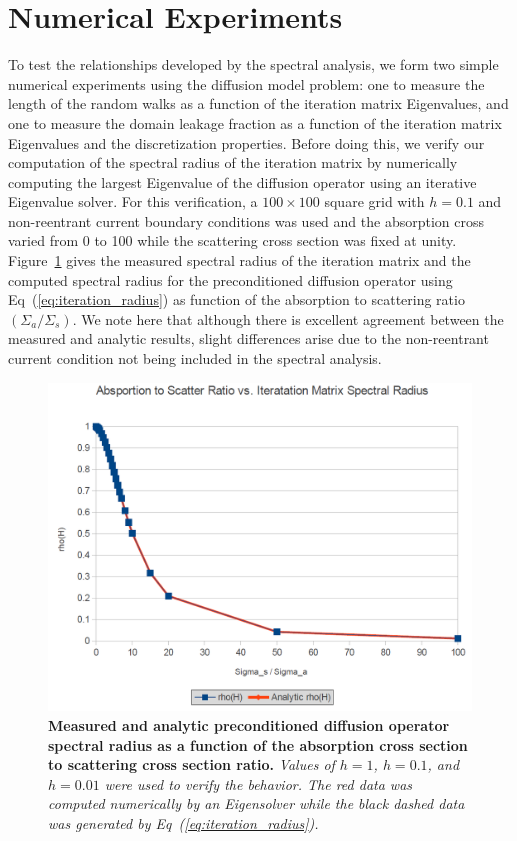 \documentclass[letterpaper,12pt]{article}
\begin{document}
\section{Numerical Experiments}
To test the relationships developed by the spectral analysis, we form
two simple numerical experiments using the diffusion model problem:
one to measure the length of the random walks as a function of the
iteration matrix Eigenvalues, and one to measure the domain leakage
fraction as a function of the iteration matrix Eigenvalues and the
discretization properties. Before doing this, we verify our
computation of the spectral radius of the iteration matrix by
numerically computing the largest Eigenvalue of the diffusion operator
using an iterative Eigenvalue solver. For this verification, a $100
\times 100$ square grid with $h=0.1$ and non-reentrant current
boundary conditions was used and the absorption cross varied from 0 to
100 while the scattering cross section was fixed at
unity. Figure~\ref{fig:measured_spec_rad} gives the measured spectral
radius of the iteration matrix and the computed spectral radius for
the preconditioned diffusion operator using
Eq~(\ref{eq:iteration_radius}) as function of the absorption to
scattering ratio $(\Sigma_a / \Sigma_s)$. We note here that although
there is excellent agreement between the measured and analytic
results, slight differences arise due to the non-reentrant
current condition not being included in the spectral analysis.
\begin{figure}[t!]
  \begin{center}
    \includegraphics[width=5in,clip]{measured_spec_rad.png}
  \end{center}
  \caption{\textbf{Measured and analytic preconditioned diffusion
      operator spectral radius as a function of the absorption cross
      section to scattering cross section ratio.} \textit{Values of
      $h=1$, $h=0.1$, and $h=0.01$ were used to verify the
      behavior. The red data was computed numerically by an
      Eigensolver while the black dashed data was generated by
      Eq~(\ref{eq:iteration_radius}).}}
  \label{fig:measured_spec_rad}
\end{figure}
\end{document}
